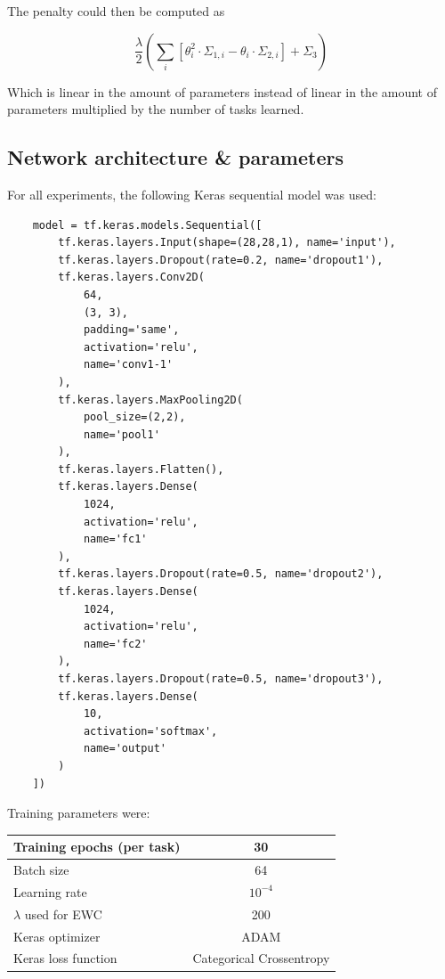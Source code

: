 \documentclass{article}
\begin{document}
            The penalty could then be computed as 

            \begin{equation*}
                \frac{\lambda}{2}
                \left(\sum_{i}{\left[\theta_i^2\cdot\Sigma_{1,i} - 
                \theta_i\cdot\Sigma_{2,i}\right]} + 
                \Sigma_3\right)
            \end{equation*}

            Which is linear in the amount of parameters instead of linear
            in the amount of parameters multiplied by the number of tasks 
            learned.



    \clearpage
    
    \clearpage
    \begin{appendices}
    \section{Network architecture \& parameters}
    \label{appendix:architecture}
    For all experiments, the following Keras sequential model was used:
    \begin{lstlisting}
    model = tf.keras.models.Sequential([
        tf.keras.layers.Input(shape=(28,28,1), name='input'),
        tf.keras.layers.Dropout(rate=0.2, name='dropout1'),
        tf.keras.layers.Conv2D(
            64, 
            (3, 3),
            padding='same',
            activation='relu',
            name='conv1-1'
        ),
        tf.keras.layers.MaxPooling2D(
            pool_size=(2,2),
            name='pool1'
        ),
        tf.keras.layers.Flatten(),
        tf.keras.layers.Dense(
            1024, 
            activation='relu',
            name='fc1'
        ),
        tf.keras.layers.Dropout(rate=0.5, name='dropout2'),
        tf.keras.layers.Dense(
            1024, 
            activation='relu', 
            name='fc2'
        ),
        tf.keras.layers.Dropout(rate=0.5, name='dropout3'),
        tf.keras.layers.Dense(
            10, 
            activation='softmax',
            name='output'
        )
    ])
    \end{lstlisting}

    Training parameters were:
    \begin{center}
        \begin{tabular}{ |l||c| } 
            \hline
            Training epochs (per task) & 30 \\ 
            \hline
            Batch size & 64 \\
            \hline
            Learning rate & $10^{-4}$ \\ 
            \hline
            $\lambda$ used for EWC & 200 \\
            \hline
            Keras optimizer & ADAM \\
            \hline
            Keras loss function & Categorical Crossentropy \\
            \hline
        \end{tabular}
    \end{center}

    \end{appendices}
\end{document}
